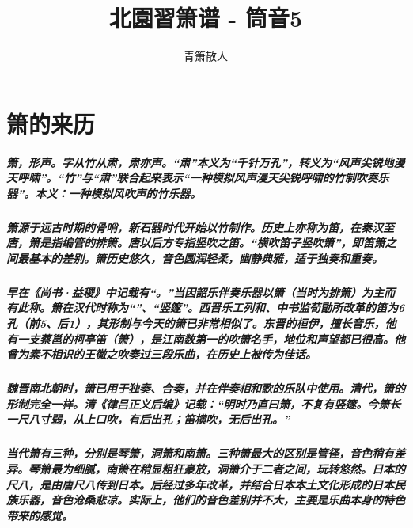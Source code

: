 \documentclass[cn,pad,chinesefont=nofont,twocol]{elegantbook}
\title{北園習箫谱 - 筒音5}
\author{青箫散人}
\date{\zhtoday}
\begin{document}
\maketitle
\frontmatter
\tableofcontents
\mainmatter

\chapter{箫的来历}
\paragraph*{箫，形声。字从竹从肃，肃亦声。“肃”本义为“千针万孔”，转义为“风声尖锐地漫天呼啸”。“竹”与“肃”联合起来表示“一种模拟风声漫天尖锐呼啸的竹制吹奏乐器”。本义：一种模拟风吹声的竹乐器。}
\paragraph*{箫源于远古时期的骨哨，新石器时代开始以竹制作。历史上亦称为笛，在秦汉至唐，箫是指编管的排箫。唐以后方专指竖吹之笛。“横吹笛子竖吹箫”，即笛箫之间最基本的差别。箫历史悠久，音色圆润轻柔，幽静典雅，适于独奏和重奏。} 
\paragraph*{早在《尚书·益稷》中记载有“。”当因韶乐伴奏乐器以箫（当时为排箫）为主而有此称。箫在汉代时称为“”、“竖篴”。西晋乐工列和、中书监荀勖所改革的笛为6 孔（前5、后1），其形制与今天的箫已非常相似了。东晋的桓伊，擅长音乐，他有一支蔡邕的柯亭笛（箫），是江南数第一的吹箫名手，地位和声望都已很高。他曾为素不相识的王徽之吹奏过三段乐曲，在历史上被传为佳话。}
\paragraph*{魏晋南北朝时，箫已用于独奏、合奏，并在伴奏相和歌的乐队中使用。清代，箫的形制完全一样。清《律吕正义后编》记载：“明时乃直曰箫，不复有竖篴。今箫长一尺八寸弱，从上口吹，有后出孔；笛横吹，无后出孔。”}
\paragraph*{当代箫有三种，分别是琴箫，洞箫和南箫。三种箫最大的区别是管径，音色稍有差异。琴箫最为细腻，南箫在稍显粗狂豪放，洞箫介于二者之间，玩转悠然。日本的尺八，是由唐尺八传到日本。后经过多年改革，并结合日本本土文化形成的日本民族乐器，音色沧桑悲凉。实际上，他们的音色差别并不大，主要是乐曲本身的特色带来的感觉。}
\end{document}
